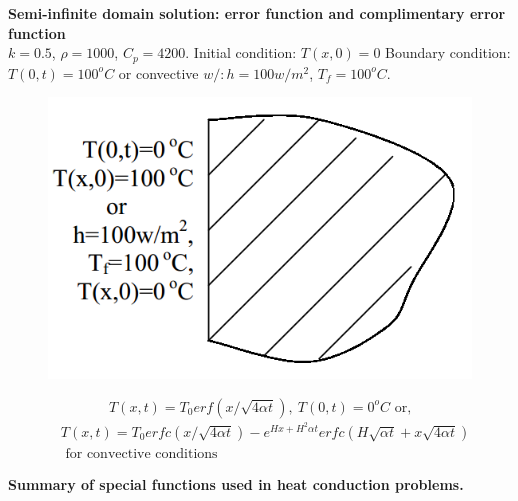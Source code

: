 \begin{example}
\textbf{Semi-infinite domain solution: error function and complimentary error
function}\\
$k = 0.5$, $\rho= 1000$, $C_p = 4200$.
Initial condition: $T(x,0)=0$
Boundary condition: $T(0,t)=100^oC$ or convective $w/:h=100w/m^2$, $T_f=100^oC$.
\begin{figure}[H]
  \centering
    \includegraphics[scale=0.5]{figures/appendixA/9}
\end{figure}
$$T(x,t)=T_0 erf(x/\sqrt{4\alpha t}),~T(0,t)=0^o C\text{ or,}$$
\begin{eqnarray*}
&T(x,t)=T_0 erfc(x/\sqrt{4\alpha t})-e^{Hx+H^2\alpha t}
erfc(H \sqrt{\alpha t}+x\sqrt{4\alpha t})\\
&\text{ for convective conditions}
\end{eqnarray*}
\end{example}

\begin{example}
\textbf{Summary of special functions used in heat conduction problems.}
\end{example}

%
